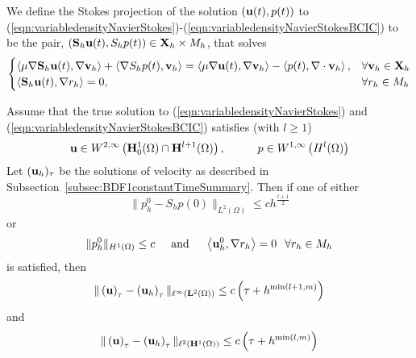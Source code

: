 \documentclass[letterpaper]{erdc}
\begin{document}
We define the Stokes projection of the solution $\left(\textbf{u}(t),p(t)\right)$ to (\ref{eqn:variabledensityNavierStokes})-(\ref{eqn:variabledensityNavierStokesBCIC}) to be the pair, $\left(\mathbf{S}_h\textbf{u}(t),S_h p(t)\right) \in \textbf{X}_h\times M_h$, that solves
\begin{equation}
  \begin{cases}
    \left\langle \mu\nabla \mathbf{S}_h\textbf{u}(t), \nabla\textbf{v}_h \right\rangle + \left\langle \nabla S_h p(t), \textbf{v}_h \right\rangle = \left\langle \mu\nabla \textbf{u}(t), \nabla\textbf{v}_h \right\rangle - \left\langle p(t), \nabla\cdot\textbf{v}_h \right\rangle, & \forall \textbf{v}_h \in \textbf{X}_h\\
    \left\langle \mathbf{S}_h \textbf{u}(t), \nabla r_h \right\rangle = 0, & \forall r_h\in M_h
  \end{cases}
\end{equation}

\begin{theorem}
  Assume that the true solution to (\ref{eqn:variabledensityNavierStokes}) and (\ref{eqn:variabledensityNavierStokesBCIC}) satisfies (with $l\geq 1$)
  \begin{equation}
    \textbf{u}\in W^{2,\infty}\left(\mathbf{H}_0^1(\Omega)\cap \mathbf{H}^{l+1}(\Omega)\right), \hspace{1cm} p\in W^{1,\infty}\left(H^{l}(\Omega) \right)
  \end{equation}
  Let $(\textbf{u}_h)_{\tau}$ be the solutions of velocity as described in Subsection~\ref{subsec:BDF1constantTimeSummary}.  Then if one of either
  \begin{equation}
    \|p_h^0 - S_h p(0) \|_{L^2(\Omega)} \leq c h^{\frac{l+1}{2}}
  \end{equation}
  or
  \begin{equation}
    \|p_h^0\|_{H^1(\Omega)} \leq c \hspace{0.5cm} \mbox{and} \hspace{0.5cm} \left\langle \textbf{u}_h^0, \nabla r_h \right\rangle = 0 \hspace{0.25cm} \forall r_h\in M_h
  \end{equation}
  is satisfied, then
  \begin{equation}
    \|\left(\textbf{u}\right)_\tau - \left(\textbf{u}_h\right)_{\tau} \|_{\ell^{\infty}(\mathbf{L}^2(\Omega))} \leq c\left( \tau + h^{\min(l+1,m)} \right)
  \end{equation}
  and
  \begin{equation}
    \|\left(\textbf{u}\right)_\tau - \left(\textbf{u}_h\right)_{\tau} \|_{\ell^{2}(\mathbf{H}^1(\Omega))} \leq c\left( \tau + h^{\min(l,m)} \right)
  \end{equation}
\end{theorem}
\end{document}
